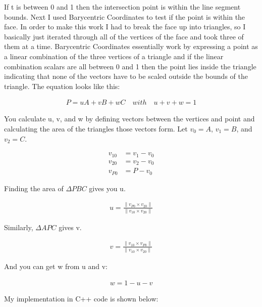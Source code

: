 \documentclass{article}
\begin{document}
If t is between 0 and 1 then the intersection point is within the line segment bounds.
Next I used Barycentric Coordinates to test if the point is within the face.
In order to make this work I had to break the face up into triangles, so I basically just iterated through all of the vertices of the face and took three of them at a time.
Barycentric Coordinates essentially work by expressing a point as a linear combination of the three vertices of a triangle and if the linear combination scalars are all between 0 and 1 then the point lies inside the triangle indicating that none of the vectors have to be scaled outside the bounds of the triangle.
The equation looks like this:

\begin{align*}
    P = uA + vB + wC \quad with \quad u + v + w = 1
\end{align*}

You calculate u, v, and w by defining vectors between the vertices and point and calculating the area of the triangles those vectors form.
Let $v_0 = A$, $v_1 = B$, and $v_2 = C$.

\begin{align*}
    v_{10} &= v_1 - v_0 \\
    v_{20} &= v_2 - v_0 \\
    v_{P0} &= P - v_0
\end{align*}

Finding the area of $\Delta{PBC}$ gives you u.

\begin{align*}
    u = \frac{\|v_{P0} \times v_{20}\|}{\|v_{10} \times v_{20}\|}
\end{align*}

Similarly, $\Delta{APC}$ gives v.

\begin{align*}
    v = \frac{\|v_{10} \times v_{P0}\|}{\|v_{10} \times v_{20}\|}
\end{align*}

And you can get w from u and v:

\begin{align*}
    w = 1 - u - v
\end{align*}

My implementation in C++ code is shown below:
\end{document}
